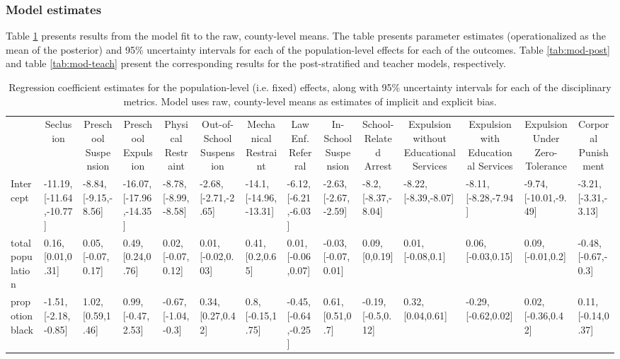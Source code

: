 \documentclass[english,floatsintext,man]{apa6}
\makeatletter
\newenvironment{lltable}
  {\begin{landscape}\begin{center}\begin{ThreePartTable}}
  {\end{ThreePartTable}\end{center}\end{landscape}}
\newcommand\LastLTentrywidth{1em}
\newlength\longtablewidth
\newcommand\getlongtablewidth{%
 \begingroup
  \ifcsname LT@\roman{LT@tables}\endcsname
  \global\longtablewidth=0pt
  \renewcommand\LT@entry[2]{\global\advance\longtablewidth by ##2\relax\gdef\LastLTentrywidth{##2}}%
  \@nameuse{LT@\roman{LT@tables}}%
  \fi
\endgroup}
\theoremstyle{definition}
\theoremstyle{definition}
\theoremstyle{remark}
\makeatother
\begin{document}
\subsubsection{Model estimates}\label{model-estimates}

Table \ref{tab:mod-raw} presents results from the model fit to the raw,
county-level means. The table presents parameter estimates
(operationalized as the mean of the posterior) and 95\% uncertainty
intervals for each of the population-level effects for each of the
outcomes. Table \ref{tab:mod-post} and table \ref{tab:mod-teach} present
the corresponding results for the post-stratified and teacher models,
respectively.

\begin{lltable}
\small{
\begin{longtable}{llllllllllllll}\noalign{\getlongtablewidth\global\LTcapwidth=\longtablewidth}
\caption{\label{tab:mod-raw}Regression coefficient estimates for the population-level (i.e. fixed) effects, along with 95\% uncertainty intervals for each of the disciplinary metrics. Model uses raw, county-level means as estimates of implicit and explicit bias.}\\
\toprule
 & \multicolumn{1}{c}{Seclusion} & \multicolumn{1}{c}{Preschool Suspension} & \multicolumn{1}{c}{Preschool Expulsion} & \multicolumn{1}{c}{Physical Restraint} & \multicolumn{1}{c}{Out-of-School Suspension} & \multicolumn{1}{c}{Mechanical Restraint} & \multicolumn{1}{c}{Law Enf. Referral} & \multicolumn{1}{c}{In-School Suspension} & \multicolumn{1}{c}{School-Related Arrest} & \multicolumn{1}{c}{Expulsion without Educational Services} & \multicolumn{1}{c}{Expulsion with Educational Services} & \multicolumn{1}{c}{Expulsion Under Zero-Tolerance} & \multicolumn{1}{c}{Corporal Punishment}\\
\midrule
Intercept & -11.19, [-11.64,-10.77] & -8.84, [-9.15,-8.56] & -16.07, [-17.96,-14.35] & -8.78, [-8.99,-8.58] & -2.68, [-2.71,-2.65] & -14.1, [-14.96,-13.31] & -6.12, [-6.21,-6.03] & -2.63, [-2.67,-2.59] & -8.2, [-8.37,-8.04] & -8.22, [-8.39,-8.07] & -8.11, [-8.28,-7.94] & -9.74, [-10.01,-9.49] & -3.21, [-3.31,-3.13]\\
total population & 0.16, [0.01,0.31] & 0.05, [-0.07,0.17] & 0.49, [0.24,0.76] & 0.02, [-0.07,0.12] & 0.01, [-0.02,0.03] & 0.41, [0.2,0.65] & 0.01, [-0.06,0.07] & -0.03, [-0.07,0.01] & 0.09, [0,0.19] & 0.01, [-0.08,0.1] & 0.06, [-0.03,0.15] & 0.09, [-0.01,0.2] & -0.48, [-0.67,-0.3]\\
propotion black & -1.51, [-2.18,-0.85] & 1.02, [0.59,1.46] & 0.99, [-0.47,2.53] & -0.67, [-1.04,-0.3] & 0.34, [0.27,0.42] & 0.8, [-0.15,1.75] & -0.45, [-0.64,-0.25] & 0.61, [0.51,0.7] & -0.19, [-0.5,0.12] & 0.32, [0.04,0.61] & -0.29, [-0.62,0.02] & 0.02, [-0.36,0.42] & 0.11, [-0.14,0.37]\\

\end{longtable}}
\end{lltable}
\end{document}

